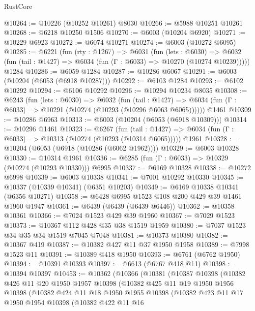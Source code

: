 \begin{lexlean}{RustCore}
\begin{coremodule}
{\begin{coremodule}
{{{{{{{{{{{{{{{{{{{{{{{{{{{{{{{{{{{{{{{{{{{{{{{@10264 := @10226 (@10252 @10261) @8030
@10266 := @5988 @10251 @10261
@10268 := @6218 @10250 @1506
@10270 := @6003 (@10204 @6920)
@10271 := @10229 @6923
@10272 := @6074 @10271
@10274 := @6003 (@10272 @6095)
@10285 := @6221
    (fun (rty : @1267) =>
    @6031
      (fun (lets : @6030) =>
      @6032 (fun (tail : @1427) => @6034 (fun (Γ : @6033) => @10270 (@10274 @10239)))))
    @1284
@10286 := @6059 @1284
@10287 := @10286 @6067
@10291 := @6003 (@10204 (@6053 (@6918 @10287)))
@10292 := @6103 @1284
@10293 := @6102 @10292
@10294 := @6106 @10292
@10296 := @10294 @10234 @8035
@10308 := @6243
    (fun (lets : @6030) =>
    @6032
      (fun (tail : @1427) =>
      @6034 (fun (Γ : @6033) => @10291 (@10274 (@10293 (@10296 @6063 @6065))))))
    @1461
@10309 := @10286 @6963
@10313 := @6003 (@10204 (@6053 (@6918 @10309)))
@10314 := @10296 @1461
@10323 := @6267
    (fun (tail : @1427) => @6034 (fun (Γ : @6033) => @10313 (@10274 (@10293 (@10314 @6065)))))
    @1961
@10328 := @10204 (@6053 (@6918 (@10286 (@6062 @1962))))
@10329 := @6003 @10328
@10330 := @10314 @1961
@10336 := @6285 (fun (Γ : @6033) => @10329 (@10274 (@10293 @10330))) @6995
@10337 := @6169 @10328
@10338 := @10272 @6998
@10339 := @6003 @10338
@10341 := @7001 @10292 @10330
@10345 := @10337 (@10339 @10341) (@6351 @10203)
@10349 := @6169 @10338 @10341 (@6356 @10271)
@10358 := @6428 @6995 @1523 @108 @200 @429 @39 @1461 @1960 @1947
@10361 := @6439 (@6439 (@6439 @6446))
@10362 := @10358 @10361
@10366 := @7024 @1523 @429 @39 @1960
@10367 := @7029 @1523
@10373 := @10367 @112 @428 @35 @38 @1519 @1959
@10380 := @7037 @1523 @34 @35 @34 @1519 @7045 @7048
@10381 := @10373 @10380
@10382 := @10367 @419
@10387 := @10382 @427 @11 @37 @1950 @1958
@10389 := @7998 @1523 @11
@10391 := @10389 @418 @1950
@10393 := @6761 (@6762 @1950)
@10394 := @10391 @10393
@10397 := @6613 (@6767 @418 @11)
@10398 := @10394 @10397
@10453 := @10362
    (@10366
      (@10381
        (@10387
          @10398
          (@10382
            @426
            @11
            @20
            @1950
            @1957
            @10398
            (@10382
              @425
              @11
              @19
              @1950
              @1956
              @10398
              (@10382
                @424
                @11
                @18
                @1950
                @1955
                @10398
                (@10382
                  @423
                  @11
                  @17
                  @1950
                  @1954
                  @10398
                  (@10382
                    @422
                    @11
                    @16
}}}}}}}}}}}}}}}}}}}}}}}}}}}}}}}}}}}}}}}}}}}}}}}
\end{coremodule}}
\end{coremodule}
\end{lexlean}
